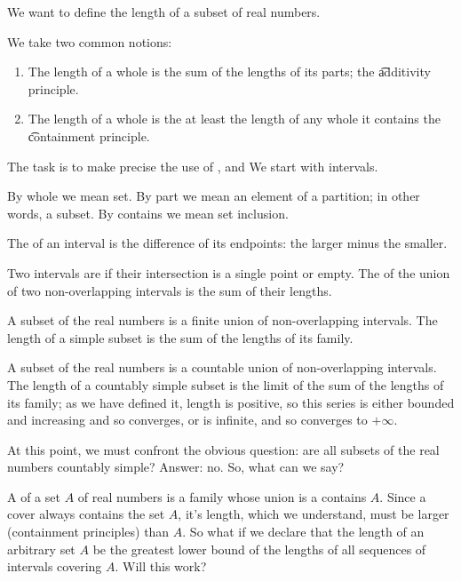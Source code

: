 

We want to define the length
of a subset of real numbers.


We take two common notions:

\begin{enumerate}

  \item
  The length of a whole
  is the sum of the lengths
  of its parts;
  the \t{additivity principle}.

  \item
  The length of a whole
  is the at least the length
  of any whole it contains
  the \t{containment principle}.

\end{enumerate}

The task is to make precise
the use of
,
and 
We start with intervals.


By whole we mean set.
By part we mean an element of a partition; in other words, a subset.
By contains we mean set inclusion.

The
of an interval is the difference
of its endpoints: the larger minus
the smaller.

Two intervals are
if their intersection
is a single point or empty.
The  of the union of
two non-overlapping intervals is
the sum of their lengths.

A  subset
of the real numbers
is a finite union
of non-overlapping intervals.
The length of a simple subset
is the sum of the lengths of
its family.

A  subset
of the real numbers
is a countable union
of non-overlapping intervals.
The length of a countably simple subset
is the limit of the sum of the lengths
of its family; as we have defined it,
length is positive, so this series is either
bounded and increasing and so converges, or is
infinite, and so converges to $+\infty$.

At this point, we must confront the obvious
question: are all subsets of the real numbers
countably simple?
Answer: no.
So, what can we say?

A 
of a set $A$ of real numbers
is a family whose union
is a contains $A$.
Since a cover always contains
the set $A$, it's length, which
we understand, must be larger
(containment principles) than
$A$.
So what if we declare that
the length of an arbitrary set
$A$ be the greatest lower bound
of the lengths of all sequences
of intervals covering $A$.
Will this work?

